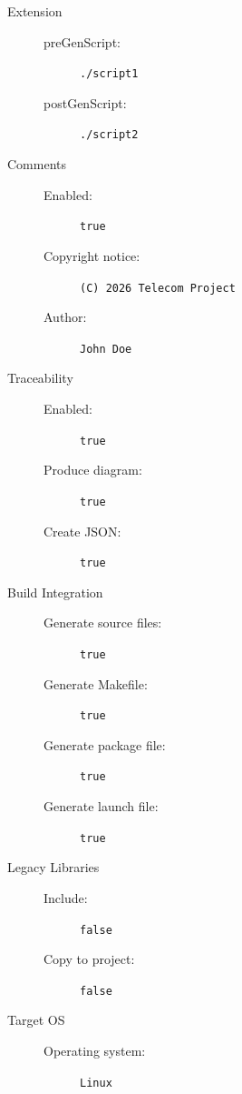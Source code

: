\begin{description}
	\item[Extension]
	\begin{description}
		\item[preGenScript:] \texttt{./script1}
		\item[postGenScript:] \texttt{./script2}
	\end{description}
	
	\item[Comments]
	\begin{description}
		\item[Enabled:] \texttt{true}
		\item[Copyright notice:] \texttt{(C) 2026 Telecom Project}
		\item[Author:] \texttt{John Doe}
	\end{description}
	
	\item[Traceability]
	\begin{description}
		\item[Enabled:] \texttt{true}
		\item[Produce diagram:] \texttt{true}
		\item[Create JSON:] \texttt{true}
	\end{description}
	
	\item[Build Integration]
	\begin{description}
		\item[Generate source files:] \texttt{true}
		\item[Generate Makefile:] \texttt{true}
		\item[Generate package file:] \texttt{true}
		\item[Generate launch file:] \texttt{true}
	\end{description}
	
	\item[Legacy Libraries]
	\begin{description}
		\item[Include:] \texttt{false}
		\item[Copy to project:] \texttt{false}
	\end{description}
	
	\item[Target OS]
	\begin{description}
		\item[Operating system:] \texttt{Linux}
	\end{description}
\end{description}


